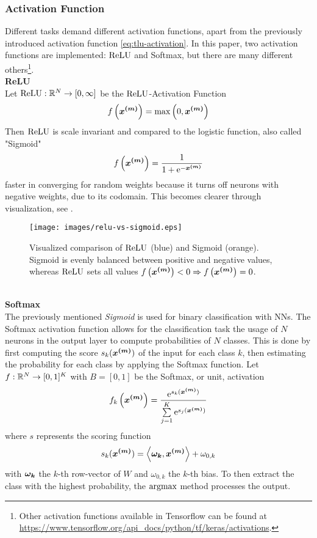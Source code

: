 \subsubsection{Activation Function}
Different tasks demand different activation functions, apart from the previously introduced activation function \eqref{eq:tlu-activation}.
In this paper, two activation functions are implemented: $\operatorname{ReLU}$ and Softmax, but there are many different others\footnote{
    Other activation functions available in Tensorflow can be found at \url{https://www.tensorflow.org/api_docs/python/tf/keras/activations}.
}.\\
\textbf{ReLU}\\
Let $\operatorname{ReLU}: \mathbb{R}^N \rightarrow [0, \infty]$ be the $\operatorname{ReLU}$-Activation Function
\begin{align}
    f\left(\bm{x^{(m)}}\right) = \max\left(0, \bm{x^{(m)}}\right)
    \label{eq:relu}
\end{align}
Then $\operatorname{ReLU}$ is scale invariant and compared to the logistic function, also called "Sigmoid"
\begin{align}
    f\left(\bm{x^{(m)}}\right) = \frac{1}{1+\operatorname{e}^{-\bm{x^{(m)}}}}
    \label{eq:sigmoid}
\end{align}
faster in converging for random weights because it turns off neurons with negative weights, due to its codomain.
This becomes clearer through visualization, see .
\begin{figure}[!ht]
    \centering
    \texttt{[image: images/relu-vs-sigmoid.eps]}
    \caption{Visualized comparison of $\operatorname{ReLU}$ (blue) and Sigmoid (orange). Sigmoid is evenly balanced between positive and negative values, whereas $\operatorname{ReLU}$ sets all values $f\left(\bm{x^{(m)}}\right) < 0 \Rightarrow f\left(\bm{x^{(m)}}\right) = 0$.}
    \label{fig:relu-vs-sigmoid}
\end{figure}
\\
\textbf{Softmax}\\
The previously mentioned \textit{Sigmoid} is used for binary classification with NNs.
The Softmax activation function allows for the classification task the usage of $N$ neurons in the output layer to compute probabilities of $N$ classes.
This is done by first computing the score $s_k(\bm{x^{(m)}})$ of the input for each class $k$, then estimating the probability for each class by applying the Softmax function.
Let $f: \mathbb{R}^{N}\rightarrow [0, 1]^{K}$ with $B = [0, 1]$ be the Softmax, or unit, activation
\begin{align}
    f_k\left(\bm{x^{(m)}}\right) = \frac{\operatorname{e}^{s_k(\bm{x^{(m)}})}}{\sum \limits_{j=1}^K\operatorname{e}^{s_j(\bm{x^{(m)}})}}
    \label{eq:softmax}
\end{align}
where $s$ represents the scoring function
\begin{align}
    s_k(\bm{x^{(m)}}) = \left\langle\bm{\omega_k}, \bm{x^{(m)}}\right\rangle + \omega_{0,k}
\end{align}
with $\bm{\omega_k}$ the $k$-th row-vector of $W$ and $\omega_{0,k}$ the $k$-th bias.
To then extract the class with the highest probability, the $\operatorname*{argmax}$ method processes the output.
